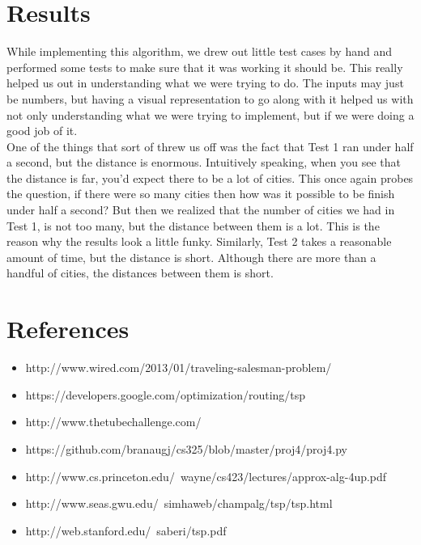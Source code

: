 \documentclass[11pt,letterpaper]{article}
\begin{document}
\section*{Results}
While implementing this algorithm, we drew out little test cases by hand and performed some tests to make sure that it was working it should be. This really helped us out in understanding what we were trying to do. The inputs may just be numbers, but having a visual representation to go along with it helped us with not only understanding what we were trying to implement, but if we were doing a good job of it.\\
One of the things that sort of threw us off was the fact that Test 1 ran under half a second, but the distance is enormous. Intuitively speaking, when you see that the distance is far, you'd expect there to be a lot of cities. This once again probes the question, if there were so many cities then how was it possible to be finish under half a second? But then we realized that the number of cities we had in Test 1, is not too many, but the distance between them is a lot. This is the reason why the results look a little funky. Similarly, Test 2 takes a reasonable amount of time, but the distance is short. Although there are more than a handful of cities, the distances between them is short.
\section*{References}
\begin{itemize}
	\item http://www.wired.com/2013/01/traveling-salesman-problem/
	\item https://developers.google.com/optimization/routing/tsp
	\item http://www.thetubechallenge.com/
	\item https://github.com/branaugj/cs325/blob/master/proj4/proj4.py
	\item http://www.cs.princeton.edu/~wayne/cs423/lectures/approx-alg-4up.pdf
	\item http://www.seas.gwu.edu/~simhaweb/champalg/tsp/tsp.html
	\item http://web.stanford.edu/~saberi/tsp.pdf
\end{itemize}
\end{document}
